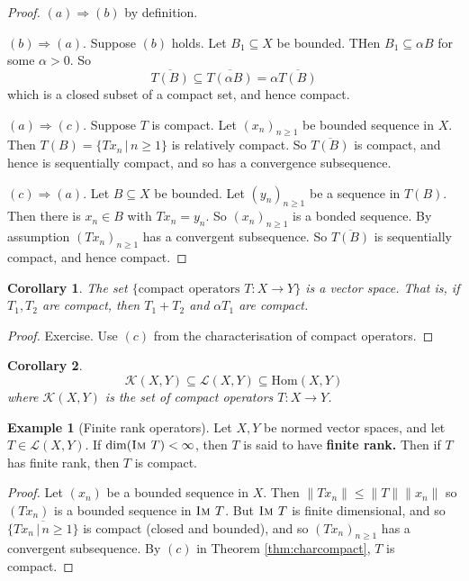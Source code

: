 \documentclass[10pt, oneside, reqno]{amsbook}
\theoremstyle{plain}%
\newtheorem*{cor}{Corollary}
\theoremstyle{definition}
\newtheorem{exmp}[thm]{Example}
\theoremstyle{remark}
\newcommand{\given}{ \, | \,}
\newcommand{\im}{\textsc{Im\ }}
\begin{document}
\begin{proof}
    $(a) \Rightarrow (b)$ by definition.
    
    $(b) \Rightarrow (a)$.  Suppose $(b)$ holds.  Let $B_1 \subseteq X$ be bounded.  THen $B_1 \subseteq \alpha B$ for some $\alpha > 0$.  So \[
        \overline{T(B)} \subseteq \overline{T(\alpha B)} = \alpha \overline{T(B)}
    \] which is a closed subset of a compact set, and hence compact.  
    
    $(a) \Rightarrow (c)$.  Suppose $T$ is compact.  Let $(x_n)_{n \geq 1}$ be bounded sequence in $X$.  Then $T(B) = \{ Tx_n \given n \geq 1 \}$ is relatively compact.  So $\overline{T(B)}$ is compact, and hence is sequentially compact, and so has a convergence subsequence.
    
    $(c) \Rightarrow (a)$.  Let $B \subseteq X$ be bounded.  Let $(y_n)_{n \geq 1}$ be a sequence in $T(B)$.  Then there is $x_n \in B$ with $Tx_n = y_n$.  So $(x_n)_{n \geq 1}$ is a bonded sequence.  By assumption $(Tx_n)_{n \geq 1}$ has a convergent subsequence.  So $\overline{T(B)}$ is sequentially compact, and hence compact.
\end{proof}

\begin{cor}
    The set $\{ \text{compact operators $T : X \rightarrow Y$}\}$ is a vector space.  That is, if $T_1, T_2$ are compact, then $T_1 + T_2$ and $\alpha T_1$ are compact.  
\end{cor}

\begin{proof}
    Exercise.  Use $(c)$ from the characterisation of compact operators.
\end{proof}

\begin{cor}
    \[
        \mathcal K(X,Y) \subseteq \mathcal L(X, Y) \subseteq \text{Hom}(X,Y)
    \] where $\mathcal K(X,Y)$ is the set of compact operators $T : X \rightarrow Y$. 
\end{cor}

\begin{exmp}[Finite rank operators]  
    Let $X, Y$ be normed vector spaces, and let $T \in \mathcal L(X,Y)$.  If $\dim(\im T) < \infty$, then $T$ is said to have \textbf{finite rank.}  Then if $T$ has finite rank, then $T$ is compact.
\end{exmp}

\begin{proof}
    Let $(x_n)$ be a bounded sequence in $X$.  Then $\| Tx_n \| \leq \| T \| \| x_n \|$ so $(Tx_n)$ is a bounded sequence in $\im T$.  But $\im T$ is finite dimensional, and so $\overline{ \{ Tx_n \given n \geq 1 \}}$ is compact (closed and bounded), and so $(Tx_n)_{n \geq 1}$ has a convergent subsequence.  By $(c)$ in Theorem \ref{thm:charcompact}, $T$ is compact. 
\end{proof}
\end{document}
